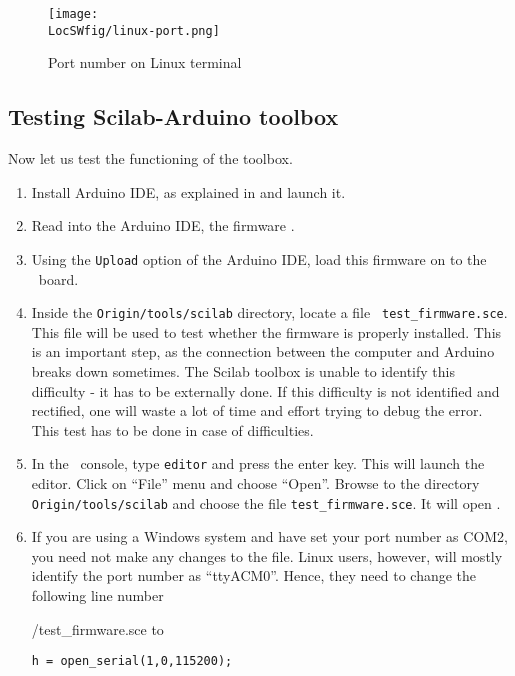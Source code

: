\begin{figure}
      \centering
      \texttt{[image: \\LocSWfig/linux-port.png]}
      \caption{Port number on Linux terminal}
      \label{linux-port}
\end{figure}

\subsection{Testing Scilab-Arduino toolbox}
\label{sec:testing-scilab-arduino}
Now let us test the functioning of the toolbox. 
\begin{enumerate}
      \item Install Arduino IDE, as explained in  and
            launch it.
      \item Read into the Arduino IDE, the firmware .
      \item Using the {\tt Upload} option of the Arduino IDE, load this
            firmware on to the \arduino\ board.
      \item Inside the {\tt Origin/tools/scilab} directory, locate a file {\tt
                        test\_firmware.sce}. This file will be used to test whether the
            firmware is properly installed.  This is an important step, as the
            connection between the computer and Arduino breaks down sometimes.
            The Scilab toolbox is unable to identify this difficulty - it has to
            be externally done.  If this difficulty is not identified and
            rectified, one will waste a lot of time and effort trying to debug
            the error.  This test has to be done in case of difficulties.
      \item In the \scilab\ console, type {\tt editor} and press the enter
            key. This will launch the editor. Click on ``File'' menu and choose
            ``Open''. Browse to the directory {\tt Origin/tools/scilab} and choose the
            file {\tt test\_firmware.sce}.  It will open
            .  
            
      \item If you are using a Windows system and have set your port number
            as COM2, you need not make any changes to the file. Linux users,
            however, will mostly identify the port number as ``ttyACM0''. Hence, 
            they need to change the following line number
            
            {\LocSWchkcode/test_firmware.sce}
            to
            \begin{lstlisting}[style=nonumbers]
  h = open_serial(1,0,115200); 
\end{lstlisting}
            

\end{enumerate}
